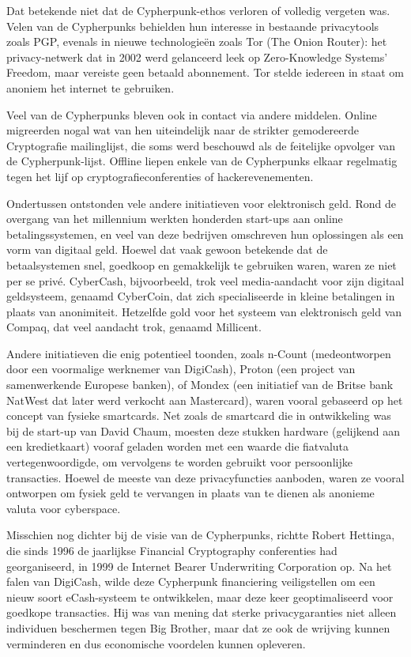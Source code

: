 \documentclass[
  a5paper,
  smalldemyvopaper,11pt,twoside,onecolumn,openright,extrafontsizes,
hidelinks]{memoir}
\begin{document}
Dat betekende niet dat de Cypherpunk-ethos verloren of volledig vergeten
was. Velen van de Cypherpunks behielden hun interesse in bestaande
privacytools zoals PGP, evenals in nieuwe technologieën zoals Tor (The
Onion Router): het privacy-netwerk dat in 2002 werd gelanceerd leek op
Zero-Knowledge Systems' Freedom, maar vereiste geen betaald abonnement.
Tor stelde iedereen in staat om anoniem het internet te gebruiken.

Veel van de Cypherpunks bleven ook in contact via andere middelen.
Online migreerden nogal wat van hen uiteindelijk naar de strikter
gemodereerde Cryptografie mailinglijst, die soms werd beschouwd als de
feitelijke opvolger van de Cypherpunk-lijst. Offline liepen enkele van
de Cypherpunks elkaar regelmatig tegen het lijf op
cryptografieconferenties of hackerevenementen.

Ondertussen ontstonden vele andere initiatieven voor elektronisch geld.
Rond de overgang van het millennium werkten honderden start-ups aan
online betalingssystemen, en veel van deze bedrijven omschreven hun
oplossingen als een vorm van digitaal geld. Hoewel dat vaak gewoon
betekende dat de betaalsystemen snel, goedkoop en gemakkelijk te
gebruiken waren, waren ze niet per se privé. CyberCash, bijvoorbeeld,
trok veel media-aandacht voor zijn digitaal geldsysteem, genaamd
CyberCoin, dat zich specialiseerde in kleine betalingen in plaats van
anonimiteit. Hetzelfde gold voor het systeem van elektronisch geld van
Compaq, dat veel aandacht trok, genaamd Millicent.

Andere initiatieven die enig potentieel toonden, zoals n-Count
(medeontworpen door een voormalige werknemer van DigiCash), Proton (een
project van samenwerkende Europese banken), of Mondex (een initiatief
van de Britse bank NatWest dat later werd verkocht aan Mastercard),
waren vooral gebaseerd op het concept van fysieke smartcards. Net zoals
de smartcard die in ontwikkeling was bij de start-up van David Chaum,
moesten deze stukken hardware (gelijkend aan een kredietkaart) vooraf
geladen worden met een waarde die fiatvaluta vertegenwoordigde, om
vervolgens te worden gebruikt voor persoonlijke transacties. Hoewel de
meeste van deze privacyfuncties aanboden, waren ze vooral ontworpen om
fysiek geld te vervangen in plaats van te dienen als anonieme valuta
voor cyberspace.

Misschien nog dichter bij de visie van de Cypherpunks, richtte Robert
Hettinga, die sinds 1996 de jaarlijkse Financial Cryptography
conferenties had georganiseerd, in 1999 de Internet Bearer Underwriting
Corporation op. Na het falen van DigiCash, wilde deze Cypherpunk
financiering veiligstellen om een nieuw soort eCash-systeem te
ontwikkelen, maar deze keer geoptimaliseerd voor goedkope transacties.
Hij was van mening dat sterke privacygaranties niet alleen individuen
beschermen tegen Big Brother, maar dat ze ook de wrijving kunnen
verminderen en dus economische voordelen kunnen opleveren.
\end{document}
